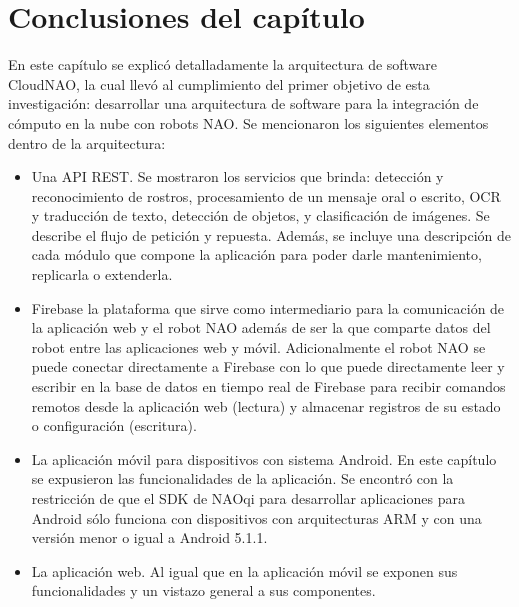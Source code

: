 \documentclass[letterpaper,12pt,spanish]{report}
\begin{document}









\section*{Conclusiones del capítulo}
En este capítulo se explicó detalladamente la arquitectura
de software CloudNAO, la cual llevó al
cumplimiento del primer objetivo
de esta investigación: desarrollar una arquitectura de 
software para la integración de cómputo en
la nube con robots NAO. Se mencionaron los 
siguientes elementos dentro de la 
arquitectura:

\begin{itemize}
    \item Una API REST. Se mostraron los servicios que brinda: detección y reconocimiento de 
    rostros, procesamiento de un mensaje oral o escrito,
    OCR y traducción de texto, detección de objetos,
    y clasificación de imágenes. Se describe
    el flujo de petición y repuesta. Además, se incluye una descripción de cada módulo que compone la aplicación para poder darle mantenimiento, replicarla o extenderla. 
    \item Firebase la plataforma que sirve como intermediario para la comunicación de la aplicación web y el robot NAO además de ser
    la que comparte datos del robot entre las aplicaciones
    web y móvil. Adicionalmente
    el robot NAO se puede
    conectar directamente a Firebase con lo que puede directamente
    leer y escribir en la base
    de datos en tiempo real de Firebase
    para recibir comandos remotos 
    desde la aplicación web (lectura) y almacenar
    registros de su estado o configuración (escritura).

    \item La aplicación móvil para dispositivos con
sistema Android. En este capítulo se expusieron las funcionalidades de la aplicación. Se encontró con la restricción de que el SDK de NAOqi para desarrollar aplicaciones para
Android sólo funciona con 
dispositivos con arquitecturas ARM
y con una versión menor o igual a Android 5.1.1.
\item La aplicación web. Al igual que en la aplicación móvil se exponen sus funcionalidades y un vistazo general
a sus componentes.
\end{itemize}
\end{document}
